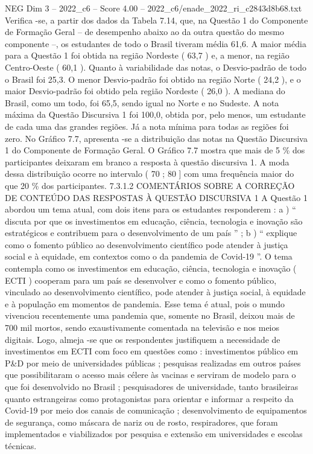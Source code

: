 \begin{textsample}{NEG Dim 3 – 2022\_c6 – Score 4.00 – 2022\_c6/enade\_2022\_ri\_c2843d8b68.txt}
Verifica -se, a partir dos dados da Tabela 7.14, que, na Questão 1 do Componente de Formação Geral – de desempenho abaixo ao da outra questão do mesmo componente –, os estudantes de todo o Brasil tiveram média 61,6.
A maior média para a Questão 1 foi obtida na região Nordeste ( 63,7 ) e, a menor, na região Centro-Oeste ( 60,1 ).
Quanto à variabilidade das notas, o Desvio-padrão de todo o Brasil foi 25,3.
O menor Desvio-padrão foi obtido na região Norte ( 24,2 ), e o maior Desvio-padrão foi obtido pela região Nordeste ( 26,0 ).
A mediana do Brasil, como um todo, foi 65,5, sendo igual no Norte e no Sudeste.
A nota máxima da Questão Discursiva 1 foi 100,0, obtida por, pelo menos, um estudante de cada uma das grandes regiões.
Já a nota mínima para todas as regiões foi zero.
No Gráfico 7.7, apresenta -se a distribuição das notas na Questão Discursiva 1 do Componente de Formação Geral.
O Gráfico 7.7 mostra que mais de 5 \% dos participantes deixaram em branco a resposta à questão discursiva 1.
A moda dessa distribuição ocorre no intervalo ( 70 ; 80 ] com uma frequência maior do que 20 \% dos participantes. 7.3.1.2 COMENTÁRIOS SOBRE A CORREÇÃO DE CONTEÚDO DAS RESPOSTAS À QUESTÃO DISCURSIVA 1 A Questão 1 abordou um tema atual, com dois itens para os estudantes responderem : a ) “ discuta por que os investimentos em educação, ciência, tecnologia e inovação são estratégicos e contribuem para o desenvolvimento de um país ” ; b ) “ explique como o fomento público ao desenvolvimento científico pode atender à justiça social e à equidade, em contextos como o da pandemia de Covid-19 ”.
O tema contempla como os investimentos em educação, ciência, tecnologia e inovação ( ECTI ) cooperam para um país se desenvolver e como o fomento público, vinculado ao desenvolvimento científico, pode atender à justiça social, à equidade e à população em momentos de pandemia.
Esse tema é atual, pois o mundo vivenciou recentemente uma pandemia que, somente no Brasil, deixou mais de 700 mil mortos, sendo exaustivamente comentada na televisão e nos meios digitais.
Logo, almeja -se que os respondentes justifiquem a necessidade de investimentos em ECTI com foco em questões como : investimentos público em P\&D por meio de universidades públicas ; pesquisas realizadas em outros países que possibilitaram o acesso mais célere às vacinas e serviram de modelo para o que foi desenvolvido no Brasil ; pesquisadores de universidade, tanto brasileiras quanto estrangeiras como protagonistas para orientar e informar a respeito da Covid-19 por meio dos canais de comunicação ; desenvolvimento de equipamentos de segurança, como máscara de nariz ou de rosto, respiradores, que foram implementados e viabilizados por pesquisa e extensão em universidades e escolas técnicas.

\end{textsample}
